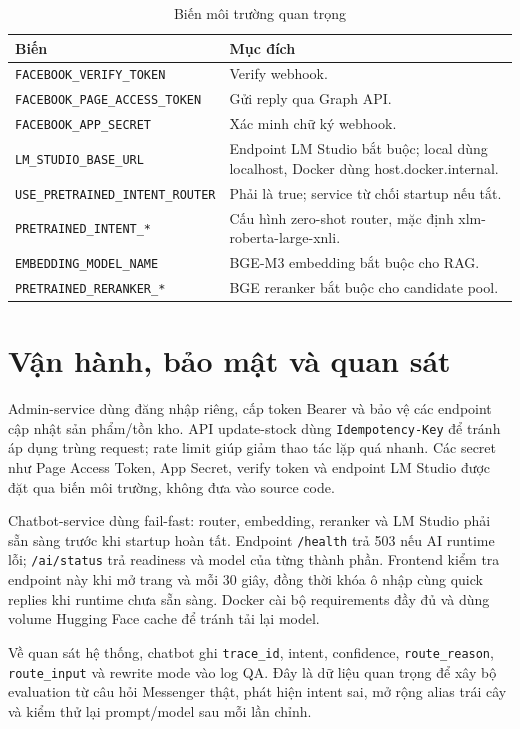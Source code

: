 \documentclass[10pt,a4paper,twocolumn]{article}
\begin{document}
\begin{table}[H]
\centering
\caption{Biến môi trường quan trọng}
\label{tab:env}
\scriptsize
\begin{tabularx}{\columnwidth}{@{}L{0.46\columnwidth}Y@{}}
\toprule
\textbf{Biến} & \textbf{Mục đích} \\
\midrule
\texttt{FACEBOOK\_VERIFY\_TOKEN} & Verify webhook. \\
\texttt{FACEBOOK\_PAGE\_ACCESS\_TOKEN} & Gửi reply qua Graph API. \\
\texttt{FACEBOOK\_APP\_SECRET} & Xác minh chữ ký webhook. \\
\texttt{LM\_STUDIO\_BASE\_URL} & Endpoint LM Studio bắt buộc; local dùng localhost, Docker dùng host.docker.internal. \\
\texttt{USE\_PRETRAINED\_INTENT\_ROUTER} & Phải là true; service từ chối startup nếu tắt. \\
\texttt{PRETRAINED\_INTENT\_*} & Cấu hình zero-shot router, mặc định xlm-roberta-large-xnli. \\
\texttt{EMBEDDING\_MODEL\_NAME} & BGE-M3 embedding bắt buộc cho RAG. \\
\texttt{PRETRAINED\_RERANKER\_*} & BGE reranker bắt buộc cho candidate pool. \\
\bottomrule
\end{tabularx}
\end{table}

\section{Vận hành, bảo mật và quan sát}
Admin-service dùng đăng nhập riêng, cấp token Bearer và bảo vệ các endpoint cập nhật sản phẩm/tồn kho. API update-stock dùng \texttt{Idempotency-Key} để tránh áp dụng trùng request; rate limit giúp giảm thao tác lặp quá nhanh. Các secret như Page Access Token, App Secret, verify token và endpoint LM Studio được đặt qua biến môi trường, không đưa vào source code.

Chatbot-service dùng fail-fast: router, embedding, reranker và LM Studio phải sẵn sàng trước khi startup hoàn tất. Endpoint \texttt{/health} trả 503 nếu AI runtime lỗi; \texttt{/ai/status} trả readiness và model của từng thành phần. Frontend kiểm tra endpoint này khi mở trang và mỗi 30 giây, đồng thời khóa ô nhập cùng quick replies khi runtime chưa sẵn sàng. Docker cài bộ requirements đầy đủ và dùng volume Hugging Face cache để tránh tải lại model.

Về quan sát hệ thống, chatbot ghi \texttt{trace\_id}, intent, confidence, \texttt{route\_reason}, \texttt{route\_input} và rewrite mode vào log QA. Đây là dữ liệu quan trọng để xây bộ evaluation từ câu hỏi Messenger thật, phát hiện intent sai, mở rộng alias trái cây và kiểm thử lại prompt/model sau mỗi lần chỉnh.
\end{document}
